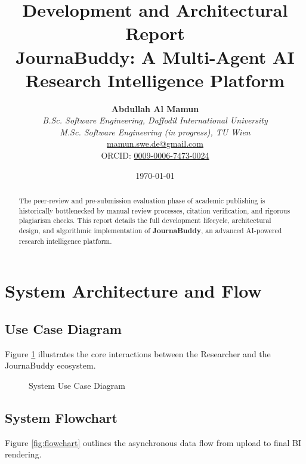 \documentclass[11pt, a4paper]{article}
\title{\textbf{\Huge Development and Architectural Report}\\[0.5em]
\Large JournaBuddy: A Multi-Agent AI Research Intelligence Platform}
\author{
    \textbf{Abdullah Al Mamun} \\
    \textit{B.Sc. Software Engineering, Daffodil International University} \\
    \textit{M.Sc. Software Engineering (in progress), TU Wien} \\
    \href{mailto:mamun.swe.de@gmail.com}{mamun.swe.de@gmail.com} \\
    ORCID: \href{https://orcid.org/0009-0006-7473-0024}{0009-0006-7473-0024}
}
\date{\today}
\begin{document}
\maketitle
\thispagestyle{empty} 

\begin{abstract}
The peer-review and pre-submission evaluation phase of academic publishing is historically bottlenecked by manual review processes, citation verification, and rigorous plagiarism checks. This report details the full development lifecycle, architectural design, and algorithmic implementation of \textbf{JournaBuddy}, an advanced AI-powered research intelligence platform. 
\end{abstract}

\tableofcontents
\newpage

\section{System Architecture and Flow}

\subsection{Use Case Diagram}
Figure \ref{fig:usecase} illustrates the core interactions between the Researcher and the JournaBuddy ecosystem.

\begin{figure}[H]
\centering
{}
\caption{System Use Case Diagram}
\label{fig:usecase}
\end{figure}

\subsection{System Flowchart}
Figure \ref{fig:flowchart} outlines the asynchronous data flow from upload to final BI rendering.
\end{document}
